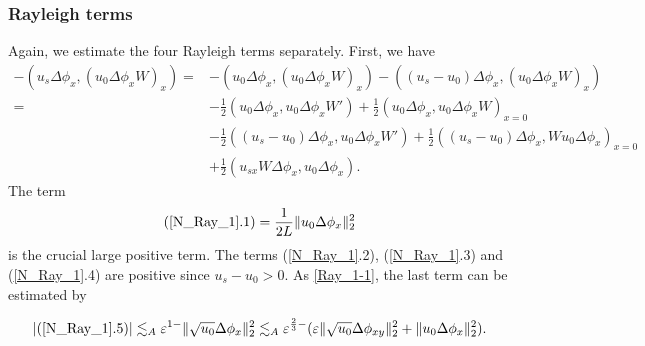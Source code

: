 \documentclass[reqno, 11pt]{amsart}
\theoremstyle{plain}
\theoremstyle{definition}
\theoremstyle{remark}
\numberwithin{equation}{section}
\begin{document}
\subsubsection{Rayleigh terms}
Again, we estimate the four Rayleigh terms separately. First, we have
\begin{equation}\label{N_Ray_1}
\begin{aligned}
-(u_s \Delta \phi_x , (u_0 \Delta\phi_x W)_x) =& -(u_0 \Delta \phi_x , (u_0 \Delta\phi_x W)_x) - ((u_{s} - u_0)\Delta \phi_x, (u_0 \Delta\phi_x W)_x)\\
=& - \frac{1}{2}( u_0 \Delta \phi_x, u_0 \Delta \phi_x W') + \frac{1}{2} (u_0 \Delta \phi_x,  u_0 \Delta \phi_x W)_{x=0}\\
&- \frac{1}{2} ((u_{s} - u_0) \Delta \phi_x , u_0 \Delta \phi_x W') +\frac{1}{2}( (u_{s} - u_0)\Delta \phi_x, Wu_0 \Delta \phi_x)_{x=0}  \\
&+ \frac{1}{2} (u_{sx}W \Delta \phi_x , u_0 \Delta \phi_x).
\end{aligned}
\end{equation}
The term 
\begin{equation}\label{N_Ray_crucial}
(\ref{N_Ray_1}.1)= \frac{1}{2L} \|u_0 \Delta \phi_x\|_2^2
\end{equation}
is the crucial large positive term. The terms (\ref{N_Ray_1}.2), (\ref{N_Ray_1}.3) and (\ref{N_Ray_1}.4) are positive since $u_s - u_0 > 0$. As \eqref{Ray_1-1}, the last term can be estimated by

\begin{equation}\label{N_Ray_1-1}
\begin{aligned}
|(\ref{N_Ray_1}.5)| \lesssim_A  \varepsilon^{1-} \| \sqrt{u_0} \Delta \phi_x\|_2^2  
\lesssim_A   \varepsilon^{\frac{2}{3}-} ( \varepsilon \| \sqrt{u_0} \Delta \phi_{xy} \|_2^2 +  \|u_0 \Delta \phi_x\|_2^2).
\end{aligned}
\end{equation}
\end{document}
